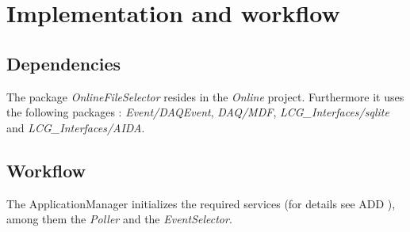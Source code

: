 \section{Implementation and workflow}\label{sec:Implementation}


\subsection{\textbf{Dependencies}}
The package \textit{OnlineFileSelector} resides in the \textit{Online} project. Furthermore it uses the following packages : \textit{Event/DAQEvent}, \textit{DAQ/MDF}, \textit{LCG\_Interfaces/sqlite} and \textit{LCG\_Interfaces/AIDA}.

\subsection{\textbf{Workflow}}
The ApplicationManager initializes the required services (for details see ADD \cite{mato1998gaudi}), among them the \textit{Poller} and the \textit{EventSelector}.\par

